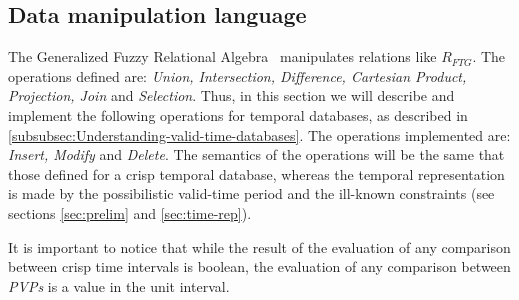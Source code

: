 
\subsection{\label{subsec:data-manipulation}Data manipulation language}

The Generalized Fuzzy Relational Algebra~\cite{Medina1994} manipulates relations like $R_{FTG}$. The operations defined are: \emph{Union, Intersection, Difference, Cartesian Product, Projection, Join} and \emph{Selection}. Thus, in this section we will describe and implement the following operations for temporal databases, as described in \ref{subsubsec:Understanding-valid-time-databases}. The operations implemented are: \emph{Insert, Modify} and \emph{Delete}. The semantics of the operations will be the same that those defined for a crisp temporal database, whereas the temporal representation is made by the possibilistic valid-time period and the ill-known constraints (see sections \ref{sec:prelim} and \ref{sec:time-rep}).

It is important to notice that while the result of the evaluation of any comparison between crisp time intervals is boolean, the evaluation of any comparison between \emph{PVPs} is a value in the unit interval. 

